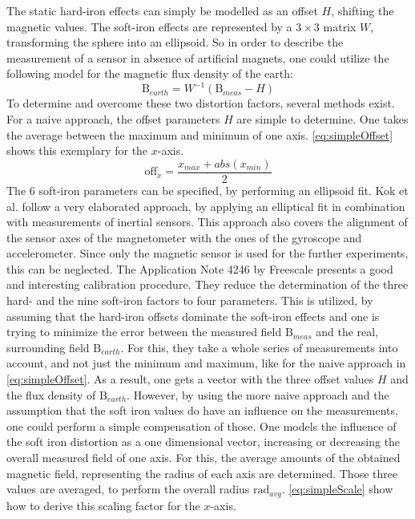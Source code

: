 The static hard-iron effects can simply be modelled as an offset $ H $, shifting the magnetic values. The soft-iron effects are represented by a $ 3\times3 $ matrix $ W $, transforming the sphere into an ellipsoid. So in order to describe the measurement of a sensor in absence of artificial magnets, one could utilize the following model for the magnetic flux density of the earth:
\begin{equation} \label{eq:hardSoftModel}
\mathrm{B}_{earth} = W^{-1} (\mathrm{B}_{meas} - H)
\end{equation}
To determine and overcome these two distortion factors, several methods exist. For a naive approach, the offset parameters $ H $ are simple to determine. One takes the average between the maximum and minimum of one axis. \ref{eq:simpleOffset} shows this exemplary for the $ x $-axis.
\begin{equation} \label{eq:simpleOffset}
\mathrm{off}_{x} = \frac{x_{max} + abs(x_{min})}{2}
\end{equation}
The 6 soft-iron parameters can be specified, by performing an ellipsoid fit. Kok et al. follow a very elaborated approach, by applying an elliptical fit in combination with measurements of inertial sensors. This approach also covers the alignment of the sensor axes of the magnetometer with the ones of the gyroscope and accelerometer. Since only the magnetic sensor is used for the further experiments, this can be neglected. The Application Note 4246 by Freescale \cite{ozyagcilar2012calibrating} presents a good and interesting calibration procedure. They reduce the determination of the three hard- and the nine soft-iron factors to four parameters. This is utilized, by assuming that the hard-iron offsets dominate the soft-iron effects and one is trying to minimize the error between the measured field $ \mathrm{B}_{meas} $ and the real, surrounding field $ \mathrm{B}_{earth} $. For this, they take a whole series of measurements into account, and not just the minimum and maximum, like for the naive approach in \ref{eq:simpleOffset}. As a result, one gets a vector with the three offset values $ H $ and the flux density of $ \mathrm{B}_{earth} $. However, by using the more naive approach and the assumption that the soft iron values do have an influence on the measurements, one could perform a simple compensation of those. One models the influence of the soft iron distortion as a one dimensional vector, increasing or decreasing the overall measured field of one axis. For this, the average amounts of the obtained magnetic field, representing the \grqq radius \grqq of each axis are determined. Those three values are averaged, to perform the overall radius $ \mathrm{rad}_{avg} $. \ref{eq:simpleScale} show how to derive this scaling factor for the $ x $-axis.
